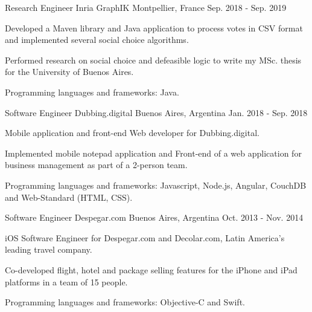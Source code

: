 

\begin{cventries}

\cventry
{Research Engineer}
{Inria GraphIK}
{Montpellier, France}
{Sep. 2018 - Sep. 2019}
{
\begin{cvitems}
\item Developed a Maven library and Java application to process votes in CSV format and implemented several social choice algorithms.
\item Performed research on social choice and defeasible logic to write my MSc. thesis for the University of Buenos Aires.
\item Programming languages and frameworks: Java.
\end{cvitems}
}  

\cventry
{Software Engineer}
{Dubbing.digital}
{Buenos Aires, Argentina}
{Jan. 2018 - Sep. 2018}
{
\begin{cvitems}
\item Mobile application and front-end Web developer for Dubbing.digital.
\item Implemented mobile notepad application and Front-end of a web application for business management as part of a 2-person team.
\item Programming languages and frameworks: Javascript, Node.js, Angular, CouchDB and Web-Standard (HTML, CSS).
\end{cvitems}
} 

\cventry
{Software Engineer}
{Despegar.com}
{Buenos Aires, Argentina}
{Oct. 2013 - Nov. 2014}
{
\begin{cvitems}
\item iOS Software Engineer for Despegar.com and Decolar.com, Latin America's leading travel company. 
\item Co-developed flight, hotel and package selling features for the iPhone and iPad platforms in a team of 15 people. 
\item Programming languages and frameworks: Objective-C and Swift.
\end{cvitems}
} 
\end{cventries}
